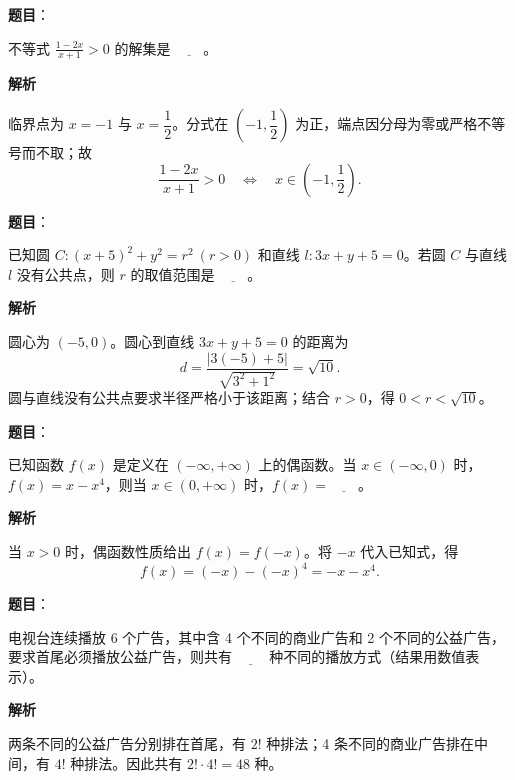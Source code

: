 \begin{answer}

\textbf{题目}：

不等式 $\displaystyle\frac{1-2x}{x+1}>0$ 的解集是 $\underline{\qquad}$。

\textbf{解析}

临界点为 $x=-1$ 与 $x=\dfrac12$。分式在 $(-1,\dfrac12)$ 为正，端点因分母为零或严格不等号而不取；故
\nopagebreak[4]
\[
\frac{1-2x}{x+1}>0\quad\Longleftrightarrow\quad x\in\left(-1,\frac12\right).
\]


\end{answer}
\begin{answer}

\textbf{题目}：

已知圆 $C:(x+5)^2+y^2=r^2\ (r>0)$ 和直线 $l:3x+y+5=0$。若圆 $C$ 与直线 $l$ 没有公共点，则 $r$ 的取值范围是 $\underline{\qquad}$。

\textbf{解析}

圆心为 $(-5,0)$。圆心到直线 $3x+y+5=0$ 的距离为
\nopagebreak[4]
\[
d=\frac{|3(-5)+5|}{\sqrt{3^2+1^2}}=\sqrt{10}.
\]
圆与直线没有公共点要求半径严格小于该距离；结合 $r>0$，得 $0<r<\sqrt{10}$。


\end{answer}
\begin{answer}

\textbf{题目}：

已知函数 $f(x)$ 是定义在 $(-\infty,+\infty)$ 上的偶函数。当 $x\in(-\infty,0)$ 时，$f(x)=x-x^4$，则当 $x\in(0,+\infty)$ 时，$f(x)=\underline{\qquad}$。

\textbf{解析}

当 $x>0$ 时，偶函数性质给出 $f(x)=f(-x)$。将 $-x$ 代入已知式，得
\nopagebreak[4]
\[
f(x)=(-x)-(-x)^4=-x-x^4.
\]


\end{answer}
\begin{answer}

\textbf{题目}：

电视台连续播放 6 个广告，其中含 4 个不同的商业广告和 2 个不同的公益广告，要求首尾必须播放公益广告，则共有 $\underline{\qquad}$ 种不同的播放方式（结果用数值表示）。

\textbf{解析}

两条不同的公益广告分别排在首尾，有 $2!$ 种排法；4 条不同的商业广告排在中间，有 $4!$ 种排法。因此共有 $2!\cdot4!=48$ 种。


\end{answer}
